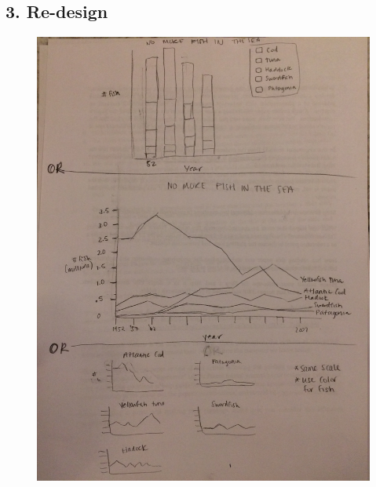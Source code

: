 \documentclass{neu_handout}
\begin{document}
\subsection*{3. Re-design}

\begin{figure}[h]
\centering
{
\includegraphics[width=0.5\linewidth]{part2_2}
}
\end{figure}
\end{document}

